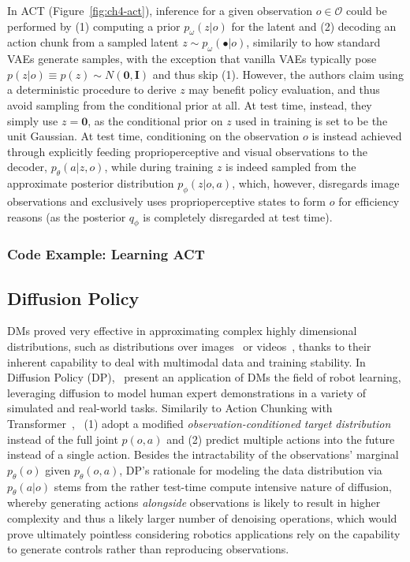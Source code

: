 In ACT (Figure~\ref{fig:ch4-act}), inference for a given observation \( o \in \mathcal O \) could be performed by (1) computing a prior \( p_\omega(z \vert o) \) for the latent and (2) decoding an action chunk from a sampled latent \( z \sim p_\omega(\bullet \vert o) \), similarily to how standard VAEs generate samples, with the exception that vanilla VAEs typically pose \( p(z\vert o) \equiv p(z) \sim N(\mathbf{0}, \mathbf{I}) \) and thus skip (1).
However, the authors claim using a deterministic procedure to derive \( z \) may benefit policy evaluation, and thus avoid sampling from the conditional prior at all.
At test time, instead, they simply use \( z = \mathbf{0} \), as the conditional prior on \( z \) used in training is set to be the unit Gaussian.
At test time, conditioning on the observation \( o \) is instead achieved through explicitly feeding proprioperceptive and visual observations to the decoder, \( p_\theta(a \vert z, o) \), while during training \( z \) is indeed sampled from the approximate posterior distribution \(p_\phi(z \vert o, a)\), which, however, disregards image observations and exclusively uses proprioperceptive states to form \( o \) for efficiency reasons (as the posterior \(q_\phi \) is completely disregarded at test time).

\subsubsection{Code Example: Learning ACT}

\subsection{Diffusion Policy}
DMs proved very effective in approximating complex highly dimensional distributions, such as distributions over images~\citep{hoDenoisingDiffusionProbabilistic2020} or videos~\citep{polyakMovieGenCast2025}, thanks to their inherent capability to deal with multimodal data and training stability.
In Diffusion Policy (DP),~\citet{chiDiffusionPolicyVisuomotor2024} present an application of DMs the field of robot learning, leveraging diffusion to model human expert demonstrations in a variety of simulated and real-world tasks.
Similarily to Action Chunking with Transformer~\citep{zhaoLearningFineGrainedBimanual2023},~\citet{chiDiffusionPolicyVisuomotor2024} (1) adopt a modified \emph{observation-conditioned target distribution} instead of the full joint \( p(o,a) \) and (2) predict multiple actions into the future instead of a single action.
Besides the intractability of the observations' marginal \( p_\theta(o) \) given \(p_\theta(o,a) \), DP's rationale for modeling the data distribution via \( p_\theta(a \vert o) \) stems from the rather test-time compute intensive nature of diffusion, whereby generating actions \emph{alongside} observations is likely to result in higher complexity and thus a likely larger number of denoising operations, which would prove ultimately pointless considering robotics applications rely on the capability to generate controls rather than reproducing observations.

